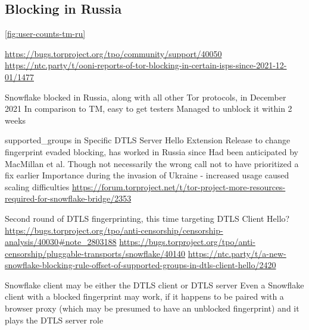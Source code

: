 \documentclass[letterpaper,twocolumn]{article}
\begin{document}

\subsection{Blocking in Russia}
\label{sec:block-ru}



\autoref{fig:user-counts-tm-ru}

\url{https://bugs.torproject.org/tpo/community/support/40050}
\url{https://ntc.party/t/ooni-reports-of-tor-blocking-in-certain-isps-since-2021-12-01/1477}

Snowflake blocked in Russia, along with all other Tor protocols,
in December 2021 \cite{ooni-2021-russia-blocks-tor}
In comparison to TM, easy to get testers
Managed to unblock it within 2 weeks

supported\_groups in Specific DTLS Server Hello Extension
Release to change fingerprint evaded blocking, has worked in Russia since
Had been anticipated by MacMillan et al.\cite[\S 3]{arxiv.2008.03254}
Though not necessarily the wrong call not to have prioritized a fix earlier
Importance during the invasion of Ukraine
- increased usage caused scaling difficulties
  \url{https://forum.torproject.net/t/tor-project-more-resources-required-for-snowflake-bridge/2353}

Second round of DTLS fingerprinting, this time targeting DTLS Client Hello?
\url{https://bugs.torproject.org/tpo/anti-censorship/censorship-analysis/40030#note_2803188}
\url{https://bugs.torproject.org/tpo/anti-censorship/pluggable-transports/snowflake/40140}
\url{https://ntc.party/t/a-new-snowflake-blocking-rule-offset-of-supported-groups-in-dtls-client-hello/2420}

Snowflake client may be either the DTLS client or DTLS server
Even a Snowflake client with a blocked fingerprint may work,
if it happens to be paired with a browser proxy (which may be presumed to have an unblocked fingerprint)
and it plays the DTLS server role
\end{document}
